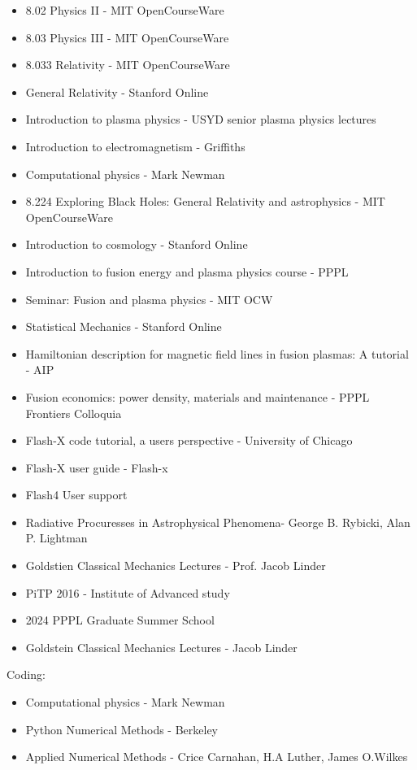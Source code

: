 \begin{itemize}
    \item 8.02 Physics II - MIT OpenCourseWare
    \item 8.03 Physics III - MIT OpenCourseWare
    \item 8.033 Relativity - MIT OpenCourseWare
    \item General Relativity - Stanford Online
    \item Introduction to plasma physics - USYD senior plasma physics lectures
    \item Introduction to electromagnetism - Griffiths
    \item Computational physics - Mark Newman
    \item 8.224 Exploring Black Holes: General Relativity and astrophysics - MIT OpenCourseWare
    \item Introduction to cosmology - Stanford Online
    \item Introduction to fusion energy and plasma physics course - PPPL
    \item Seminar: Fusion and plasma physics - MIT OCW
    \item Statistical Mechanics - Stanford Online
    \item Hamiltonian description for magnetic field lines in fusion plasmas: A tutorial - AIP
    \item Fusion economics: power density, materials and maintenance - PPPL Frontiers Colloquia
    \item Flash-X code tutorial, a users perspective - University of Chicago 
    \item Flash-X user guide - Flash-x
    \item Flash4 User support
    \item Radiative Procuresses in Astrophysical Phenomena- George B. Rybicki, Alan P. Lightman
    \item Goldstien Classical Mechanics Lectures - Prof. Jacob Linder
    \item PiTP 2016 - Institute of Advanced study
    \item 2024 PPPL Graduate Summer School
    \item Goldstein Classical Mechanics Lectures - Jacob Linder
\end{itemize}
Coding:
\begin{itemize}
    \item Computational physics - Mark Newman
    \item Python Numerical Methods - Berkeley 
    \item Applied Numerical Methods - Crice Carnahan, H.A Luther, James O.Wilkes
\end{itemize}
